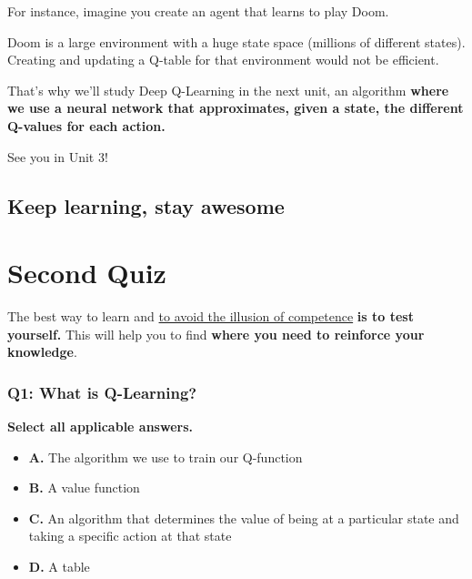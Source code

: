 \documentclass[11pt,a4paper]{article}
\begin{document}
For instance, imagine you create an agent that learns to play Doom.


Doom is a large environment with a huge state space (millions of different states). Creating and updating a Q-table for that environment would not be efficient.

That's why we'll study Deep Q-Learning in the next unit, an algorithm \textbf{where we use a neural network that approximates, given a state, the different Q-values for each action.}


See you in Unit 3!

\subsection{Keep learning, stay awesome}\label{keep-learning-stay-awesome}

\section{Second Quiz}\label{second-quiz}

The best way to learn and \href{https://www.coursera.org/lecture/learning-how-to-learn/illusions-of-competence-BuFzf}{to avoid the illusion of competence} \textbf{is to test yourself.} This will help you to find \textbf{where you need to reinforce your knowledge}.

\subsubsection{Q1: What is Q-Learning?}\label{q1-what-is-q-learning}

\textbf{Select all applicable answers.}

\begin{itemize}
\tightlist
\item
  \textbf{A.} The algorithm we use to train our Q-function
\item
  \textbf{B.} A value function
\item
  \textbf{C.} An algorithm that determines the value of being at a particular state and taking a specific action at that state
\item
  \textbf{D.} A table
\end{itemize}
\end{document}

